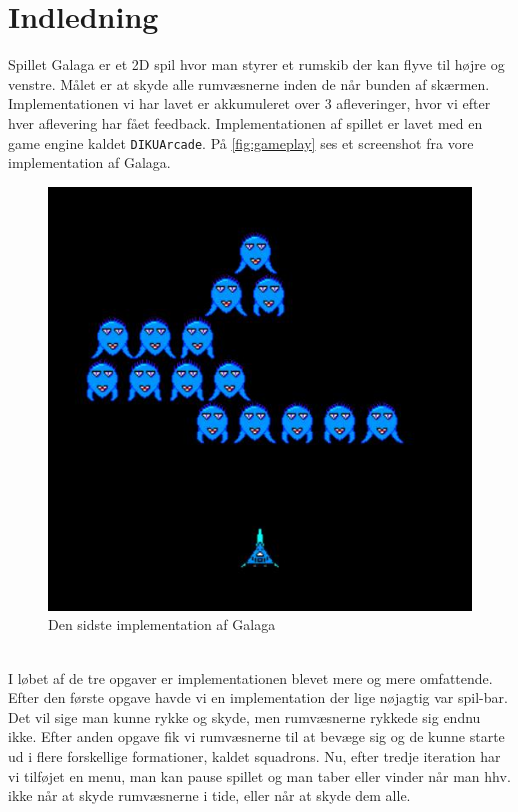 

\section{Indledning}
Spillet Galaga er et 2D spil hvor man styrer et rumskib der kan flyve til højre og venstre. Målet er at skyde alle rumvæsnerne inden de når bunden af skærmen. Implementationen vi har lavet er akkumuleret over 3 afleveringer, hvor vi efter hver aflevering har fået feedback. Implementationen af spillet er lavet med en game engine kaldet \texttt{DIKUArcade}. På \autoref{fig:gameplay} ses et screenshot fra vore implementation af Galaga.
\begin{figure}[!ht]
  \center
  \includegraphics[scale=0.3]{latex/GamePlay}
  \caption{Den sidste implementation af Galaga}
  \label{fig:gameplay}
\end{figure}
\\I løbet af de tre opgaver er implementationen blevet mere og mere omfattende. Efter den første opgave havde vi en implementation der lige nøjagtig var spil-bar. Det vil sige man kunne rykke og skyde, men rumvæsnerne rykkede sig endnu ikke. Efter anden opgave fik vi rumvæsnerne til at bevæge sig og de kunne starte ud i flere forskellige formationer, kaldet squadrons. Nu, efter tredje iteration har vi tilføjet en menu, man kan pause spillet og man taber eller vinder når man hhv. ikke når at skyde rumvæsnerne i tide, eller når at skyde dem alle.
